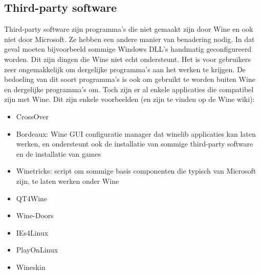 \documentclass[12pt]{article}
\begin{document}
\subsection{Third-party software}
Third-party software zijn programma's die niet gemaakt zijn door Wine en ook niet door Microsoft. Ze hebben een andere manier van benadering nodig. In dat geval moeten bijvoorbeeld sommige Windows DLL's handmatig geconfigureerd worden. Dit zijn dingen die Wine niet echt ondersteunt. Het is voor gebruikers zeer ongemakkelijk om dergelijke programma's aan het werken te krijgen. De bedoeling van dit soort programma's is ook om gebruikt te worden buiten Wine en dergelijke programma's om. Toch zijn er al enkele applicaties die compatibel zijn met Wine. Dit zijn enkele voorbeelden (en zijn te vinden op de Wine wiki): 
\begin{itemize}
	\item CrossOver
	\item Bordeaux: Wine GUI configuratie manager dat winelib applicaties kan laten werken, en ondersteunt ook de installatie van sommige third-party software en de installatie van games
	\item Winetricks: script om sommige basis componenten die typisch van Microsoft zijn, te laten werken onder Wine
	\item QT4Wine
	\item Wine-Doors
	\item IEs4Linux
	\item PlayOnLinux
	\item Wineskin
\end{itemize}
\newpage
\end{document}
